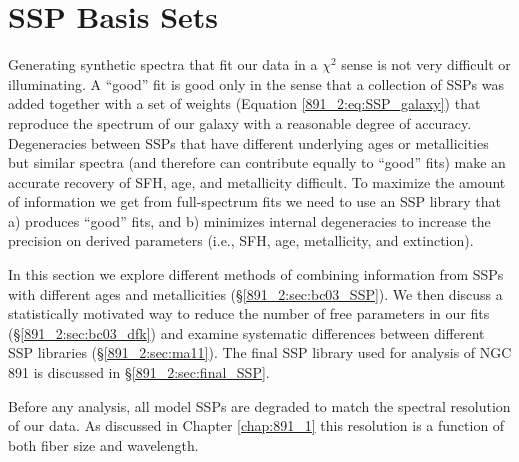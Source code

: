\section{SSP Basis Sets}
\label{891_2:sec:SSP_sets}

Generating synthetic spectra that fit our data in a $\chi^2$ sense is
not very difficult or illuminating. A ``good'' fit is good only in the
sense that a collection of SSPs was added together with a set of
weights (Equation \ref{891_2:eq:SSP_galaxy}) that reproduce the spectrum of
our galaxy with a reasonable degree of accuracy. Degeneracies between
SSPs that have different underlying ages or metallicities but similar
spectra (and therefore can contribute equally to ``good'' fits) make
an accurate recovery of SFH, age, and metallicity difficult. To
maximize the amount of information we get from full-spectrum fits we
need to use an SSP library that a) produces ``good'' fits, and b)
minimizes internal degeneracies to increase the precision on derived
parameters (i.e., SFH, age, metallicity, and extinction).

In this section we explore different methods of combining information
from SSPs with different ages and metallicities
(\S\ref{891_2:sec:bc03_SSP}). We then discuss a statistically
motivated way to reduce the number of free parameters in our fits
(\S\ref{891_2:sec:bc03_dfk}) and examine systematic differences
between different SSP libraries (\S\ref{891_2:sec:ma11}). The final
SSP library used for analysis of NGC 891 is discussed in
\S\ref{891_2:sec:final_SSP}.

Before any analysis, all model SSPs are degraded to match the spectral
resolution of our data. As discussed in Chapter \ref{chap:891_1} this
resolution is a function of both \GP fiber size and wavelength.


